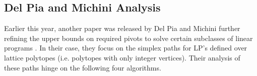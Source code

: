 \documentclass[11pt]{article}
\begin{document}

\subsection{Del Pia and Michini Analysis}
Earlier this year, another paper was released by Del Pia and Michini further refining the upper bounds on required pivots to solve certain subclasses of linear programs \cite{pia}. In their case, they focus on the simplex paths for LP's defined over lattice polytopes (i.e. polytopes with only integer vertices). Their analysis of these paths hinge on the following four algorithms.
\end{document}
